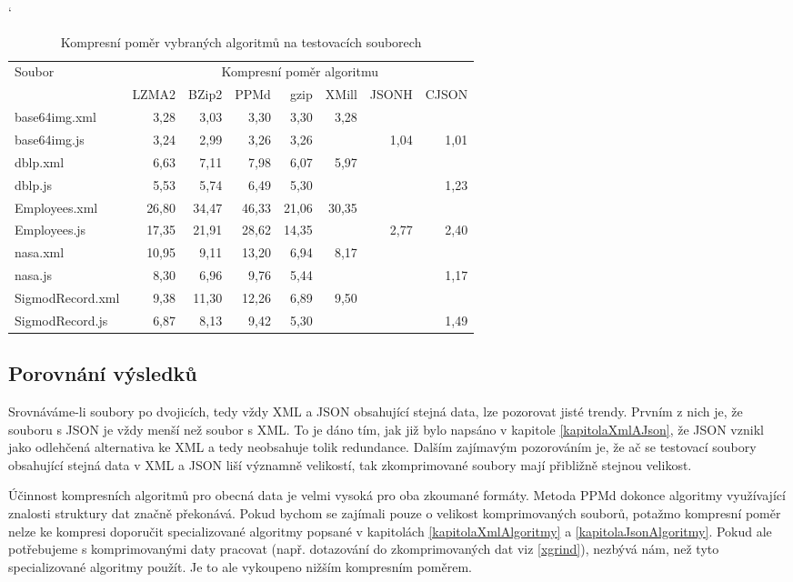 \begin{table}[!h]
\catcode`
\centering
\begin{tabular}{|l|r|r|r|r|r|r|r|}
\hline
 \multirow{2}{*}{Soubor} & \multicolumn{7}{|c|}{Kompresní poměr algoritmu}\\
 \cline{2-8}
 & LZMA2 & BZip2 & PPMd & gzip & XMill & JSONH & CJSON\\
 \hline
 base64img.xml & 3,28 & 3,03 & 3,30 & 3,30 & 3,28 & & \\
 base64img.js & 3,24 & 2,99 & 3,26 & 3,26 & & 1,04 & 1,01\\
 \hline
 dblp.xml & 6,63 & 7,11 & 7,98 & 6,07 & 5,97 & & \\
 dblp.js & 5,53 & 5,74 & 6,49 & 5,30 & & & 1,23\\
 \hline
 Employees.xml & 26,80 & 34,47 & 46,33 & 21,06 & 30,35 & & \\
 Employees.js & 17,35 & 21,91 & 28,62 & 14,35 & & 2,77 & 2,40\\
 \hline
 nasa.xml & 10,95 & 9,11 & 13,20 & 6,94 & 8,17 & & \\
 nasa.js & 8,30 & 6,96 & 9,76 & 5,44 & & & 1,17\\
 \hline
 SigmodRecord.xml & 9,38 & 11,30 & 12,26 & 6,89 & 9,50 & & \\
 SigmodRecord.js & 6,87 & 8,13 & 9,42 & 5,30 & & & 1,49\\
\hline
\end{tabular}
\caption{Kompresní poměr vybraných algoritmů na testovacích souborech}
\label{tabulkaKompresniPomer}
\end{table}

\subsection{Porovnání výsledků}
Srovnáváme-li soubory po dvojicích, tedy vždy XML a JSON obsahující stejná data, lze pozorovat jisté trendy. Prvním z nich je, že souboru s JSON je vždy menší než soubor s XML. To je dáno tím, jak již bylo napsáno v kapitole \ref{kapitolaXmlAJson}, že JSON vznikl jako odlehčená alternativa ke XML a tedy neobsahuje tolik redundance. Dalším zajímavým pozorováním je, že ač se testovací soubory obsahující stejná data v XML a JSON liší významně velikostí, tak zkomprimované soubory mají přibližně stejnou velikost.

Účinnost kompresních algoritmů pro obecná data je velmi vysoká pro oba zkoumané formáty. Metoda PPMd dokonce algoritmy využívající znalosti struktury dat značně pře\-ko\-ná\-vá. Pokud bychom se zajímali pouze o velikost komprimovaných souborů, potažmo kompresní poměr nelze ke kompresi doporučit specializované algoritmy popsané v kapitolách \ref{kapitolaXmlAlgoritmy} a \ref{kapitolaJsonAlgoritmy}. Pokud ale potřebujeme s komprimovanými daty pracovat (např. dotazování do zkomprimovaných dat viz \ref{xgrind}), nezbývá nám, než tyto specializované algoritmy použít. Je to ale vykoupeno nižším kompresním poměrem.

